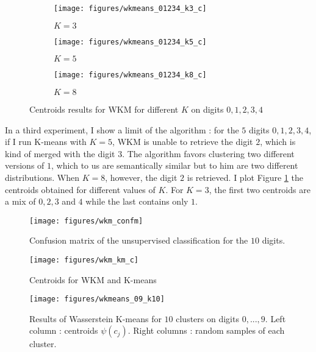 \documentclass{article}
\begin{document}
\begin{figure}[!htb]
	\centering
	\begin{subfigure}{.8\textwidth}
		\centering \texttt{[image: figures/wkmeans\_01234\_k3\_c]}
		\caption{$K=3$}
	\end{subfigure}
	\begin{subfigure}{.8\textwidth}
		\centering \texttt{[image: figures/wkmeans\_01234\_k5\_c]}
		\caption{$K=5$}
	\end{subfigure}
	\begin{subfigure}{.8\textwidth}
		\centering \texttt{[image: figures/wkmeans\_01234\_k8\_c]}
		\caption{$K=8$}
	\end{subfigure}
	\caption{Centroids results for WKM for different $K$ on digits $0, 1, 2, 3, 4$}
	\label{fig:wkmeans_01234_c}
\end{figure}


In a third experiment, I show a limit of the algorithm : for the $5$ digits $0, 1, 2, 3, 4$, if I run K-means with $K=5$, WKM is unable to retrieve the digit $2$, which is kind of merged with the digit $3$. The algorithm favors clustering two different versions of $1$, which to us are semantically similar but to him are two different distributions. When $K=8$, however, the digit $2$ is retrieved. I plot Figure \ref{fig:wkmeans_01234_c} the centroids obtained for different values of $K$. For $K=3$, the first two centroids are a mix of $0, 2, 3$ and $4$ while the last contains only $1$.

\begin{figure}[!htb]
	\centering
	\texttt{[image: figures/wkm\_confm]}
	\caption{Confusion matrix of the unsupervised classification for the $10$ digits.}
	\label{fig:wkm_confm}
\end{figure}

\begin{figure}[!htb]
	\centering
	\texttt{[image: figures/wkm\_km\_c]}
	\caption{Centroids for WKM and K-means}
	\label{fig:wkm_km_c}
\end{figure}

\begin{figure}[!htb]
	\centering
	\texttt{[image: figures/wkmeans\_09\_k10]}
	\caption{Results of Wasserstein K-means for $10$ clusters on digits $0,...,9$. Left column : centroids $\psi(c_j)$. Right columns : random samples of each cluster.}
	\label{fig:wkmeans_09_k10}
\end{figure}
\end{document}
